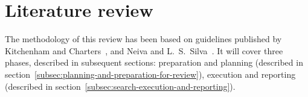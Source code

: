 \section{Literature review}\label{sec:literature-review}

The methodology of this review has been based on guidelines published by Kitchenham and Charters~\cite{kitchenham_guidelines_2007}, and Neiva and L.~S.~Silva~\cite{neiva_systematic_2016}.
It will cover three phases, described in subsequent sections: preparation and planning (described in section~\ref{subsec:planning-and-preparation-for-review}), execution and reporting (described in section~\ref{subsec:search-execution-and-reporting}).




